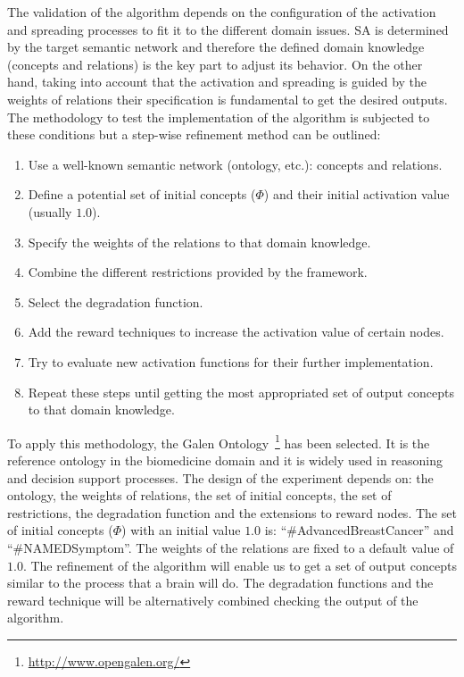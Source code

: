 The validation of the algorithm depends on the configuration of the activation and spreading processes to
fit it to the different domain issues. SA is determined by the target semantic network and therefore
the defined domain knowledge (concepts and relations) is the key part to adjust its behavior. On the other
hand, taking into account that the activation and spreading is guided by the weights of relations their specification 
is fundamental to get the desired outputs. The methodology to test the implementation
of the algorithm is subjected to these conditions but a step-wise refinement method can be outlined:
\begin{enumerate}
  \item Use a well-known semantic network (ontology, etc.): concepts and relations.
  \item Define a potential set of initial concepts ($\Phi$) and their initial activation value (usually $1.0$).
  \item Specify the weights of the relations to that domain knowledge.
  \item Combine the different restrictions provided by the framework.
  \item Select the degradation function.
  \item Add the reward techniques to increase the activation value of certain nodes.
  \item Try to evaluate new activation functions for their further implementation.
  \item Repeat these steps until getting the most appropriated set of output concepts to that domain knowledge.
\end{enumerate}

To apply this methodology, the Galen Ontology~\footnote{\url{http://www.opengalen.org/}} has been selected. 
It is the reference ontology in the biomedicine domain and it is widely used in reasoning and decision support processes. 
The design of the experiment depends on: the ontology, the weights of relations, the set of initial concepts, 
the set of restrictions, the degradation function and the extensions to reward nodes. The set of initial 
concepts ($\Phi$) with an initial value $1.0$ is: ``\#AdvancedBreastCancer'' and ``\#NAMEDSymptom''. The weights of the 
relations are fixed to a default value of $1.0$. The refinement of the algorithm will enable us to get
a set of output concepts similar to the process that a brain will do. The degradation functions
and the reward technique will be alternatively combined checking the output of the algorithm. 

